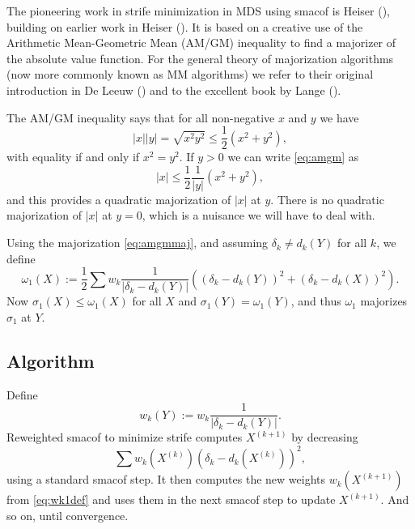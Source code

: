 \documentclass[
  12pt,
  letterpaper,
  DIV=11,
  numbers=noendperiod]{scrartcl}
\theoremstyle{plain}
\theoremstyle{plain}
\theoremstyle{plain}
\theoremstyle{definition}
\theoremstyle{remark}
\begin{document}
The pioneering work in strife minimization in MDS using smacof is Heiser
(), building on earlier work in Heiser
(). It is based on a creative use of the
Arithmetic Mean-Geometric Mean (AM/GM) inequality to find a majorizer of
the absolute value function. For the general theory of majorization
algorithms (now more commonly known as MM algorithms) we refer to their
original introduction in De Leeuw ()
and to the excellent book by Lange ().

The AM/GM inequality says that for all non-negative \(x\) and \(y\) we
have \begin{equation}
|x||y|=\sqrt{x^2y^2}\leq\frac12(x^2+y^2),\label{eq:amgm}
\end{equation} with equality if and only if \(x^2=y^2\). If \(y>0\) we
can write \eqref{eq:amgm} as \begin{equation}
|x|\leq\frac12\frac{1}{|y|}(x^2+y^2),\label{eq:amgmmaj}
\end{equation} and this provides a quadratic majorization of \(|x|\) at
\(y\). There is no quadratic majorization of \(|x|\) at \(y=0\), which
is a nuisance we will have to deal with.

Using the majorization \eqref{eq:amgmmaj}, and assuming
\(\delta_k\not=d_k(Y)\) for all \(k\), we define \begin{equation}
\omega_1(X):=\frac12\sum w_k\frac{1}{|\delta_k-d_k(Y)|}((\delta_k-d_k(Y))^2+(\delta_k-d_k(X))^2).\label{eq:omegadef}
\end{equation} Now \(\sigma_1(X)\leq\omega_1(X)\) for all \(X\) and
\(\sigma_1(Y)=\omega_1(Y)\), and thus \(\omega_1\) majorizes
\(\sigma_1\) at \(Y\).

\subsection{Algorithm}\label{algorithm}

Define \begin{equation}
w_k(Y):=w_k\frac{1}{|\delta_k-d_k(Y)|}.\label{eq:wk1def}
\end{equation} Reweighted smacof to minimize strife computes
\(X^{(k+1)}\) by decreasing \begin{equation}
\sum w_k(X^{(k)})(\delta_k-d_k(X^{(k)}))^2,\label{eq:sstrf}
\end{equation} using a standard smacof step. It then computes the new
weights \(w_k(X^{(k+1)})\) from \eqref{eq:wk1def} and uses them in the
next smacof step to update \(X^{(k+1)}\). And so on, until convergence.
\end{document}
